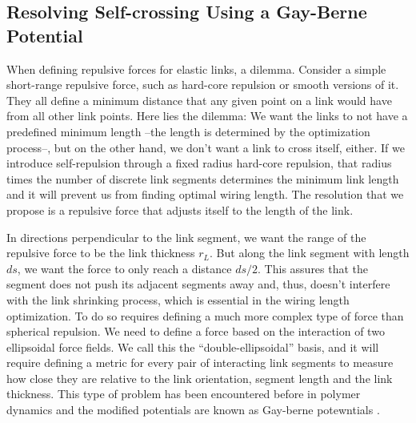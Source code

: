 \documentclass[linenumbers,endfloats,nofootinbib,preprint,floatfix,titlepage,superscriptaddress]{revtex4-1} %
\begin{document}
\subsection{Resolving Self-crossing Using a Gay-Berne Potential \label{ap:gay-berne}}
When defining repulsive forces for elastic links,  a dilemma. 
Consider a simple short-range repulsive force, such as hard-core repulsion or smooth versions of it. 
They all define a minimum distance that any given point on a link would have from all other link points. 
Here lies the dilemma: 
We want the links to not have a predefined minimum length --the length is determined by the optimization process--, but on the other hand, we don't want a link to cross itself, either. 
If we introduce self-repulsion through a fixed radius hard-core repulsion, that radius times the number of discrete link segments determines the minimum link length and it will prevent us from finding optimal wiring length. 
The resolution that we propose is a repulsive force that adjusts itself to the length of the link. 

In directions perpendicular to the link segment, we want the range of the repulsive force to be the link thickness $r_L$. But along the link segment with length $ds$, we want the force to only reach a distance $ds/2$. 
This assures that the segment does not push its adjacent segments away and, thus, doesn't interfere with the link shrinking process, which is essential in the wiring length optimization.
To do so requires defining a much more complex type of force than spherical repulsion. 
We need to define a force based on the interaction of two ellipsoidal force fields. We call this the ``double-ellipsoidal'' basis, and it will require defining a metric for every pair of interacting link segments to measure how close they are relative to the link orientation, segment length and the link thickness. 
This type of problem has been encountered before in polymer dynamics and the modified potentials are known as Gay-berne potewntials \citep{berne1972gaussian,gay1981modification,babadi2006coarse}. 
\end{document}
